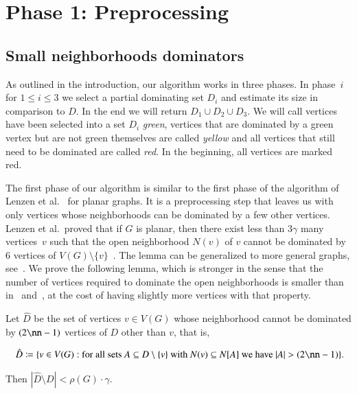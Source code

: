 

\section{Phase 1: Preprocessing}\label{sec:step1}
\subsection{Small neighborhoods dominators}
As outlined in the introduction, our algorithm works in three phases.
In phase~$i$ for $1\leq i\leq 3$ we select a partial dominating set
$D_i$ and estimate its size in comparison to $D$. In the end we will
return $D_1\cup D_2\cup D_3$. We will call vertices have been selected
into a set $D_i$ \emph{green}, vertices that are dominated by a green
vertex but are not green themselves are called \emph{yellow} and all
vertices that still need to be dominated are called \emph{red}. In the
beginning, all vertices are marked red.

The first phase of our algorithm is similar to the first phase of the
algorithm of Lenzen et al.~\cite{lenzen2013distributed} for planar graphs.
It is a preprocessing step that leaves us with only vertices whose
neighborhoods can be dominated by a few other vertices. Lenzen et al.\
proved that if $G$ is planar, then there exist less than $3\gamma$
many vertices~$v$ such
that the open neighborhood $N(v)$ of $v$ cannot be dominated by $6$
vertices of $V(G)\setminus \{v\}$~\mbox{\cite[Lemma
6.3]{lenzen2013distributed}}. The lemma can be generalized to more
general graphs, see~\cite{amiri2019distributed}. We prove the
following lemma, which is stronger in the sense that the number of
vertices required to dominate the open neighborhoods is smaller than
in~\cite{lenzen2013distributed} and~\cite{amiri2019distributed}, at the cost of having slightly more vertices with that property.



\begin{lemma}\label{lenzen-improved}
  Let $\hat{D}$ be the set of vertices $v\in V(G)$ whose neighborhood
  cannot be dominated by $(2\nn-1)$ vertices of $D$ other than $v$,
  that is,

  \vspace{-4mm}
  \[
    \text{ $\hat{D}\coloneqq \{v\in V(G) :$ for all sets
      $A\subseteq D\setminus \{v\}$ with $N(v)\subseteq N[A]$ we have
      $|A|> (2\nn-1)\}$.}
  \]


  Then $|\hat{D}\setminus D| < \rho(G)\cdot\gamma$.
\end{lemma}

